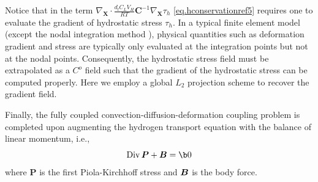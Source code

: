\documentclass[10pt]{elsarticle}
\newcommand{\mbs}[1]{\boldsymbol{#1}}
\def\bs{{\mbs{s}}} \def\bt{{\mbs{t}}} \def\bu{{\mbs{u}}}
\DeclareMathOperator{\Div}{Div}
\def\bs{\boldsymbol}
\newcommand{\tensor}[1]{\ensuremath{\boldsymbol{#1}}}
\begin{document}
Notice that in the term 
$\nabla_{\bs{X}}  \cdot \frac{d_{l} C_{L}V_{H}}{RT} \bs{C}^{-1} \nabla_{\bs{X}}\tau_{h}$ \eqref{eq.hconservationref5}
requires one to evaluate the gradient of hydrostatic stress $\tau_{h}$. In a typical finite element model
(except the nodal integration method \cite{Krysl:2008}), physical quantities such as deformation gradient
 and stress are typically only evaluated at the integration points but not at the nodal points. 
 Consequently, the hydrostatic stress field must be extrapolated as a $C^{o}$ field  such that the gradient of the hydrostatic
 stress can be computed properly. Here we employ a global $L_{2}$ projection scheme to recover the gradient field. 
 
Finally, the fully coupled convection-diffusion-deformation coupling problem is completed upon augmenting the hydrogen transport equation with the balance of linear momentum, i.e.,
\begin{equation}
\label{eq:balanceLinearMomentum} \Div \tensor{P} +  \bB = \b0  
\end{equation}
where $\tensor{P}$ is the first Piola-Kirchhoff stress and $\bB$ is the body force. 
%
\end{document}
